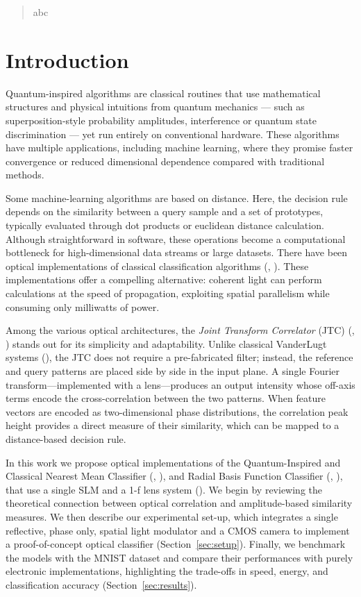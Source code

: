 \documentclass[twocolumn]{article} %
\begin{document}
\coverpage

\begin{abstract}
    abc
\end{abstract}


\section{Introduction}

Quantum-inspired algorithms are classical routines that use mathematical structures and physical intuitions from quantum mechanics — such as superposition-style probability amplitudes, interference or quantum state discrimination — yet run entirely on conventional hardware.  
These algorithms have multiple applications, including machine learning, where they promise faster convergence or reduced dimensional dependence compared with traditional methods.

Some machine-learning algorithms are based on distance. 
Here, the decision rule depends on the similarity between a query sample and a set of prototypes, typically evaluated through dot products or euclidean distance calculation.  Although straightforward in software, these operations become a computational bottleneck for high-dimensional data streams or large datasets.  
There have been optical implementations of classical classification algorithms (\cite{Neifeld1993}, \cite{Foor1995}). These implementations offer a compelling alternative: coherent light can perform calculations at the speed of propagation, exploiting spatial parallelism while consuming only milliwatts of power.

Among the various optical architectures, the \emph{Joint Transform Correlator} (JTC) (\cite{Psaltis1984}, \cite{Dragulinescu2023}) stands out for its simplicity and adaptability.  Unlike classical VanderLugt systems (\cite{VanderLugt1964}), the JTC does not require a pre-fabricated filter; instead, the reference and query patterns are placed side by side in the input plane.  A single Fourier transform—implemented with a lens—produces an output intensity whose off-axis terms encode the cross-correlation between the two patterns.  
When feature vectors are encoded as two-dimensional phase distributions, the correlation peak height provides a direct measure of their similarity, which can be mapped to a distance-based decision rule.

In this work we propose optical implementations of the Quantum-Inspired and Classical Nearest Mean Classifier (\cite{Cruzeiro2024}, \cite{Sergioli2025}), and Radial Basis Function Classifier (\cite{Neifeld1993}, \cite{Foor1995}), that use a single SLM and a 1-f lens system (\cite{Javidi1989}).  We begin by reviewing the theoretical connection between optical correlation and amplitude-based similarity measures. We then describe our experimental set-up, which integrates a single reflective, phase only, spatial light modulator and a CMOS camera to implement a proof-of-concept optical classifier (Section~\ref{sec:setup}).  Finally, we benchmark the models with the MNIST dataset and compare their performances with purely electronic implementations, highlighting the trade-offs in speed, energy, and classification accuracy (Section~\ref{sec:results}).
\end{document}
